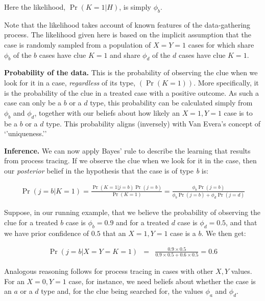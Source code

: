 \documentclass[12pt,]{book}
\begin{document}
Here the likelihood, \(\Pr(K=1|H)\), is simply \(\phi_b\).

Note that the likelihood takes account of known features of the data-gathering process. The likelihood given here is based on the implicit assumption that the case is randomly sampled from a population of \(X=Y=1\) cases for which share \(\phi_b\) of the \(b\) cases have clue \(K=1\) and share \(\phi_d\) of the \(d\) cases have clue \(K=1\).

\textbf{Probability of the data.} This is the probability of observing the clue when we look for it in a case, \emph{regardless} of its type, \((\Pr(K=1))\). More specifically, it is the probability of the clue in a treated case with a positive outcome. As such a case can only be a \(b\) or a \(d\) type, this probability can be calculated simply from \(\phi_b\) and \(\phi_d\), together with our beliefs about how likely an \(X=1, Y=1\) case is to be a \(b\) or a \(d\) type.
This probability aligns (inversely) with Van Evera's concept of `'uniqueness.''

\textbf{Inference.} We can now apply Bayes' rule to describe the learning that results from process tracing. If we observe the clue when we look for it in the case, then our \emph{posterior} belief in the hypothesis that the case is of type \emph{b} is:

\begin{eqnarray*}
\Pr(j = b |K=1)= \frac{\Pr(K=1|j = b) \Pr(j = b) }{\Pr(K=1)}= \frac{\phi_b \Pr(j = b) }{\phi_b \Pr(j = b)+\phi_d \Pr(j = d)}
\end{eqnarray*}

Suppose, in our running example, that we believe the probability of observing the clue for a treated \(b\) case is \(\phi_b=0.9\) and for a treated \(d\) case is \(\phi_d=0.5\), and that we have prior confidence of \(0.5\) that an \(X=1, Y=1\) case is a \(b\). We then get:

\begin{eqnarray*}
\Pr(j = b |X=Y=K=1)&=&\frac{0.9\times 0.5}{0.9 \times 0.5 + 0.6 \times 0.5}=0.6
\end{eqnarray*}

Analogous reasoning follows for process tracing in cases with other \(X,Y\) values. For an \(X=0, Y=1\) case, for instance, we need beliefs about whether the case is an \(a\) or a \(d\) type and, for the clue being searched for, the values \(\phi_a\) and \(\phi_d\).
\end{document}
